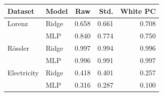\begin{tabular}{llrrr}
\toprule
Dataset & Model & Raw & Std. & White PC \\
\midrule
Lorenz & Ridge & 0.658 & 0.661 & 0.708 \\
 & MLP & 0.840 & 0.774 & 0.750 \\
R\"ossler & Ridge & 0.997 & 0.994 & 0.996 \\
 & MLP & 0.996 & 0.991 & 0.997 \\
Electricity & Ridge & 0.418 & 0.401 & 0.257 \\
 & MLP & 0.316 & 0.287 & 0.100 \\
\bottomrule
\end{tabular}
